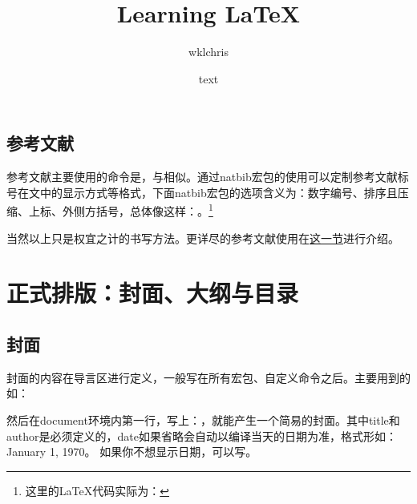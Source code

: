 {\subsection{参考文献}
\label{subsec:cite}
参考文献主要使用的命令是\latexline{\\cite}，与\latexline{\\label}相似。通过natbib宏包的使用可以定制参考文献标号在文中的显示方式等格式，下面natbib宏包的选项含义为：数字编号、排序且压缩、上标、外侧方括号，总体像这样：\textsuperscript{\ttfamily [1,3-5]}。\footnote{这里的LaTeX代码实际为：\latexline{\\textsuperscript{\\ttfamily [1,3-5]}}}

当然以上只是权宜之计的书写方法。更详尽的参考文献使用在\hyperref[sec:bibtex]{\bibtex{}这一节}进行介绍。

\section{正式排版：封面、大纲与目录}

\subsection{封面}
封面的内容在导言区进行定义，一般写在所有宏包、自定义命令之后。主要用到的如：
\begin{latex}{}
\title{Learning LaTeX}
\author{wklchris}
\date{text}
\end{latex}

然后在document环境内第一行，写上：\latexline{\\maketitle}，就能产生一个简易的封面。其中title和author是必须定义的，date如果省略会自动以编译当天的日期为准，格式形如：January 1, 1970。 如果你不想显示日期，可以写\latexline{\\date{}}。

}
